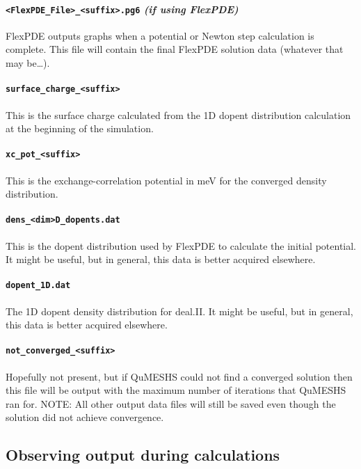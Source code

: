 \documentclass[12pt]{article}
\newcommand{\red}[1]{{\color{red} \it #1}}
\newcommand{\commentout}[1]{}
\begin{document}
\paragraph{\texttt{<FlexPDE\_File>\_<suffix>.pg6} \emph{(if using FlexPDE)}}
FlexPDE outputs graphs when a potential or Newton step calculation is complete.  This
file will contain the final FlexPDE solution data (whatever that may be\ldots).

\paragraph{\texttt{surface\_charge\_<suffix>}}
This is the surface charge \commentout{\red{what units?}} calculated from the 1D dopent distribution
calculation at the beginning of the simulation.

\paragraph{\texttt{xc\_pot\_<suffix>}}
This is the exchange-correlation potential in meV for the converged density distribution.

\paragraph{\texttt{dens\_<dim>D\_dopents.dat}}
This is the dopent distribution used by FlexPDE to calculate the initial potential.  It
might be useful, but in general, this data is better acquired elsewhere.

\paragraph{\texttt{dopent\_1D.dat}}
The 1D dopent density distribution for deal.II.  It might be useful, but in general, this
data is better acquired elsewhere.

\paragraph{\texttt{not\_converged\_<suffix>}}
Hopefully not present, but if QuMESHS could not find a converged solution then this
file will be output with the maximum number of iterations that QuMESHS ran for.
{\color{red} NOTE:} All other output data files will still be saved even though the
solution did not achieve convergence.


\subsection{Observing output during calculations}
\label{subsec:IntermediateOutput}
\end{document}
